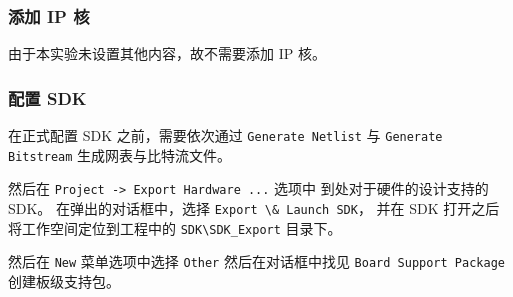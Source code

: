 \documentclass{ctexart}
\begin{document}
        \subsubsection{添加 IP 核}
        
        由于本实验未设置其他内容，故不需要添加 IP 核。
        
        \subsubsection{配置 SDK}
        
        在正式配置 SDK 之前，需要依次通过 
        \verb|Generate Netlist| 与 \verb|Generate Bitstream|
        生成网表与比特流文件。
        
        然后在 \verb|Project -> Export Hardware ...| 选项中
        到处对于硬件的设计支持的 SDK。
        在弹出的对话框中，选择 \verb|Export \& Launch SDK|，
        并在 SDK 打开之后将工作空间定位到工程中的
        \verb|SDK\SDK_Export| 目录下。
        
        然后在 \verb|New| 菜单选项中选择 \verb|Other|
        然后在对话框中找见 \verb|Board Support Package|
        创建板级支持包。
\end{document}
